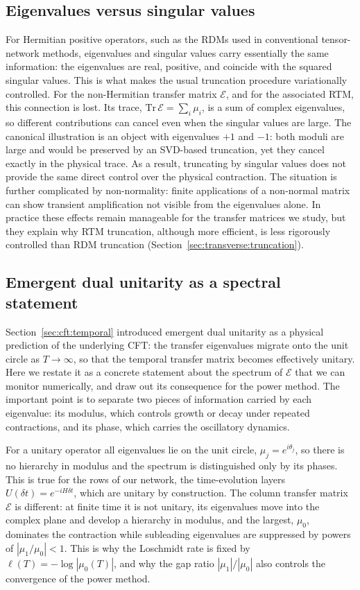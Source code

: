 \subsection{Eigenvalues versus singular values}

For Hermitian positive operators, such as the RDMs used in conventional tensor-network methods, eigenvalues and singular values carry essentially the same information: the eigenvalues are real, positive, and coincide with the squared singular values. This is what makes the usual truncation procedure variationally controlled. For the non-Hermitian transfer matrix $\mathcal{E}$, and for the associated RTM, this connection is lost. Its trace, $\mathrm{Tr}\,\mathcal{E}=\sum_i\mu_i$, is a sum of complex eigenvalues, so different contributions can cancel even when the singular values are large. The canonical illustration is an object with eigenvalues $+1$ and $-1$: both moduli are large and would be preserved by an SVD-based truncation, yet they cancel exactly in the physical trace. As a result, truncating by singular values does not provide the same direct control over the physical contraction. The situation is further complicated by non-normality: finite applications of a non-normal matrix can show transient amplification not visible from the eigenvalues alone. In practice these effects remain manageable for the transfer matrices we study, but they explain why RTM truncation, although more efficient, is less rigorously controlled than RDM truncation (Section~\ref{sec:transverse:truncation}).

\subsection{Emergent dual unitarity as a spectral statement}
\label{sec:emergent}

Section~\ref{sec:cft:temporal} introduced emergent dual unitarity as a physical prediction of the underlying CFT: the transfer eigenvalues migrate onto the unit circle as $T\to\infty$, so that the temporal transfer matrix becomes effectively unitary. Here we restate it as a concrete statement about the spectrum of $\mathcal{E}$ that we can monitor numerically, and draw out its consequence for the power method. The important point is to separate two pieces of information carried by each eigenvalue: its modulus, which controls growth or decay under repeated contractions, and its phase, which carries the oscillatory dynamics.

For a unitary operator all eigenvalues lie on the unit circle, $\mu_j=e^{i\theta_j}$, so there is no hierarchy in modulus and the spectrum is distinguished only by its phases. This is true for the rows of our network, the time-evolution layers $U(\delta t)=e^{-iH\delta t}$, which are unitary by construction. The column transfer matrix $\mathcal{E}$ is different: at finite time it is not unitary, its eigenvalues move into the complex plane and develop a hierarchy in modulus, and the largest, $\mu_0$, dominates the contraction while subleading eigenvalues are suppressed by powers of $|\mu_1/\mu_0|<1$. This is why the Loschmidt rate is fixed by $\ell(T)=-\log|\mu_0(T)|$, and why the gap ratio $|\mu_1|/|\mu_0|$ also controls the convergence of the power method.


